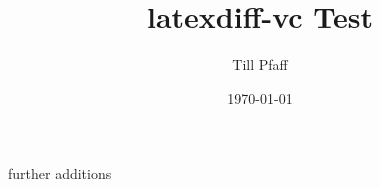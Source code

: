 \documentclass{scrartcl}
\begin{document}
\author{Till Pfaff}
\date{\today}
\title{latexdiff-vc Test}
\maketitle
\lipsum[1-2]
\lipsum[3-4]
further additions
\end{document}
